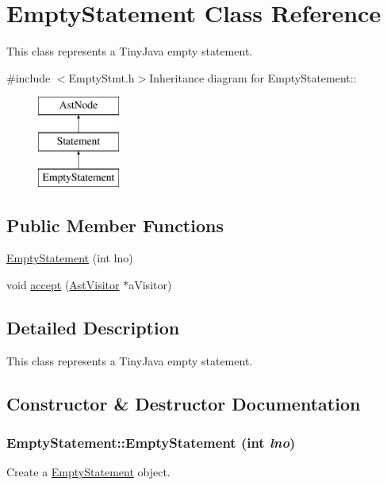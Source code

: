 \hypertarget{classEmptyStatement}{
\section{EmptyStatement Class Reference}
\label{classEmptyStatement}
}


This class represents a TinyJava empty statement.  


{\ttfamily \#include $<$EmptyStmt.h$>$}Inheritance diagram for EmptyStatement::\begin{figure}[H]
\begin{center}
\leavevmode
\includegraphics[height=3cm]{classEmptyStatement}
\end{center}
\end{figure}
\subsection*{Public Member Functions}
\begin{DoxyCompactItemize}
\item 
\hyperlink{classEmptyStatement_a95dfede9144f6f66b6ded4497147ec16}{EmptyStatement} (int lno)
\item 
void \hyperlink{classEmptyStatement_a54138a042d8de2fecf90448a0048757b}{accept} (\hyperlink{classAstVisitor}{AstVisitor} $\ast$aVisitor)
\end{DoxyCompactItemize}


\subsection{Detailed Description}
This class represents a TinyJava empty statement. 

\subsection{Constructor \& Destructor Documentation}
\hypertarget{classEmptyStatement_a95dfede9144f6f66b6ded4497147ec16}{
\subsubsection[{EmptyStatement}]{\setlength{\rightskip}{0pt plus 5cm}EmptyStatement::EmptyStatement (int {\em lno})}}
\label{classEmptyStatement_a95dfede9144f6f66b6ded4497147ec16}
Create a \hyperlink{classEmptyStatement}{EmptyStatement} object.


